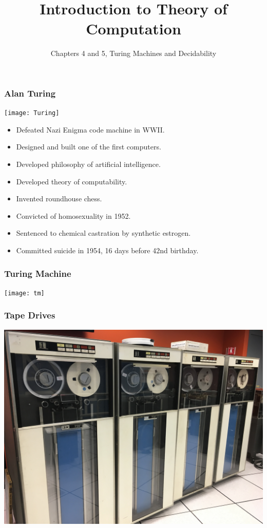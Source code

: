 \documentclass{beamer}
\title{Introduction to Theory of Computation}
\author{Chapters 4 and 5, Turing Machines and Decidability}
\newcommand{\bfr}[1]{\begin{frame}[fragile]\frametitle{{#1}}}
\begin{document}
\begin{frame}
\maketitle

\end{frame}

\bfr{Alan Turing}
\begin{multicols}{2}
\texttt{[image: Turing]}
\columnbreak
\begin{itemize}
  \pause
\item Defeated Nazi Enigma code machine in WWII.
  \pause
\item Designed and built one of the first computers.
  \pause
\item Developed philosophy of artificial intelligence.
  \pause
\item Developed theory of computability.
  \pause
\item Invented roundhouse chess.
  \pause
\end{itemize}
\end{multicols}

\begin{itemize}
\item Convicted of homosexuality in 1952.
  \pause
\item Sentenced to chemical castration by synthetic estrogen.
  \pause
\item Committed suicide in 1954, 16 days before 42nd birthday.
\end{itemize}

\end{frame}

\bfr{Turing Machine}
\texttt{[image: tm]}
\end{frame}

\bfr{Tape Drives}
\includegraphics[width=\textwidth]{tapedrives}
\end{frame}
\end{document}
